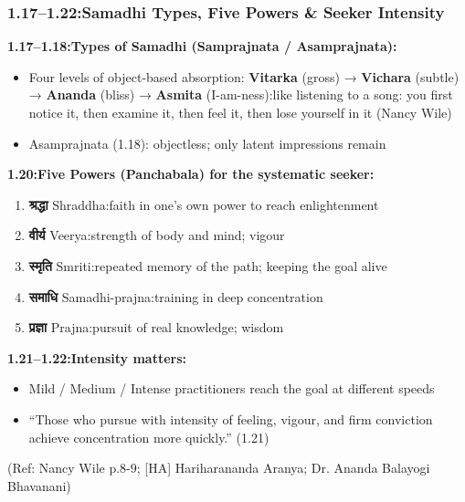 \begin{frame}[fragile]\frametitle{1.17–1.22:Samadhi Types, Five Powers \& Seeker Intensity}

\textbf{1.17–1.18:Types of Samadhi (Samprajnata / Asamprajnata):}
\begin{itemize}
\item Four levels of object-based absorption: \textbf{Vitarka} (gross) → \textbf{Vichara} (subtle) → \textbf{Ananda} (bliss) → \textbf{Asmita} (I-am-ness):like listening to a song: you first notice it, then examine it, then feel it, then lose yourself in it (Nancy Wile)
\item Asamprajnata (1.18): objectless; only latent impressions remain
\end{itemize}

\textbf{1.20:Five Powers (Panchabala) for the systematic seeker:}
\begin{enumerate}
\item \textbf{श्रद्धा} Shraddha:faith in one's own power to reach enlightenment
\item \textbf{वीर्य} Veerya:strength of body and mind; vigour
\item \textbf{स्मृति} Smriti:repeated memory of the path; keeping the goal alive
\item \textbf{समाधि} Samadhi-prajna:training in deep concentration
\item \textbf{प्रज्ञा} Prajna:pursuit of real knowledge; wisdom
\end{enumerate}

\textbf{1.21–1.22:Intensity matters:}
\begin{itemize}
\item Mild / Medium / Intense practitioners reach the goal at different speeds
\item ``Those who pursue with intensity of feeling, vigour, and firm conviction achieve concentration more quickly.'' (1.21)
\end{itemize}

\tiny{(Ref: Nancy Wile p.8-9; [HA] Hariharananda Aranya; Dr. Ananda Balayogi Bhavanani)}

\end{frame}


